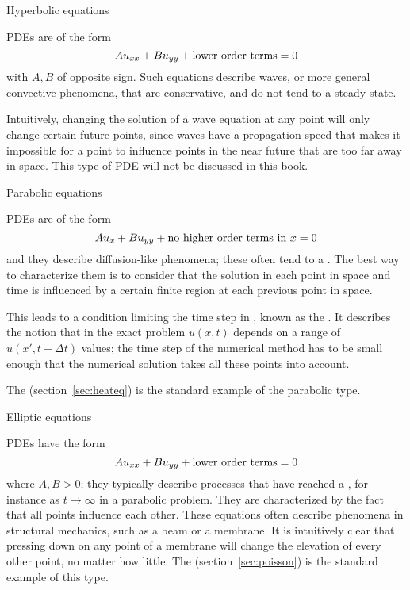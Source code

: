  {Hyperbolic equations}

\acp{PDE} are of the form
\begin{equation}
  Au_{xx}+Bu_{yy}+\hbox{lower order terms} =0
\end{equation}
with $A,B$ of opposite sign. Such equations describe waves,
or more general convective phenomena, that are conservative,
and do not tend to a steady state.

Intuitively, changing the solution of a wave equation at any point
will only change certain future points, since waves have a propagation
speed that makes it impossible for a point to influence points in the
near future that are too far away in space. This type of \ac{PDE} will
not be discussed in this book.

 {Parabolic equations}

\acp{PDE} are of the form
\begin{equation}
  Au_x+Bu_{yy}+\hbox{no higher order terms in $x$}=0
\end{equation}
and they describe diffusion-like phenomena; these often tend to a
. The best way to
characterize them is to consider that the solution in each point in
space and time is influenced by a certain finite region at each
previous point in space.

\begin{remark}
  This leads to a condition limiting
  the time step in , known as the
  .
  It describes the notion that in the exact problem $u(x,t)$ depends
  on a range of $u(x',t-\Delta t)$ values; the time step of the
  numerical method has to be small enough that the numerical solution
  takes all these points into account.
\end{remark}

The 
(section~\ref{sec:heateq}) is the standard example of the parabolic type.

 {Elliptic equations}

\acp{PDE} have the form 
\begin{equation}
  Au_{xx}+Bu_{yy}+\hbox{lower order terms} =0
\end{equation}
where $A,B>0$; they typically describe processes that have reached a
, for instance as $t\rightarrow\infty$ in a parabolic
problem. They are characterized by the fact that all points influence
each other. These equations often describe phenomena in structural
mechanics, such as a beam or a membrane. It is intuitively clear that
pressing down on any point of a membrane will change the elevation of
every other point, no matter how little.
The 
(section~\ref{sec:poisson}) is the standard example of
this type.

